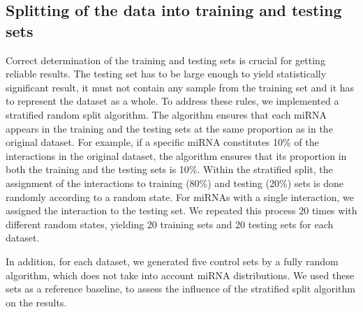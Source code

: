 \documentclass{bmcart}
\begin{document}
\subsection*{Splitting of the data into training and testing sets} \label{method:split}
Correct determination of the training and testing sets is crucial for getting reliable results. The testing set has to be large enough to yield statistically significant result, it must not contain any sample from the training set and it has to represent the dataset as a whole. 
To address these rules, we implemented a stratified random split algorithm. The algorithm ensures that each miRNA appears in the training and the testing sets at the same proportion as in the original dataset. For example, if a specific miRNA constitutes 10\% of the interactions in the original dataset, the algorithm ensures that its proportion in both the training and the testing sets is 10\%. Within the stratified split, the assignment of the interactions to training (80\%) and testing (20\%) sets is done randomly according to a random state. For miRNAs with a single interaction, we assigned the interaction to the testing set.
We repeated this process 20 times with different random states, yielding 20 training sets and 20 testing sets for each dataset.

In addition, for each dataset, we generated five control sets by a fully random algorithm, which does not take into account miRNA distributions. We used these sets as a reference baseline, to assess the influence of the stratified split algorithm on the results.

\end{document}
